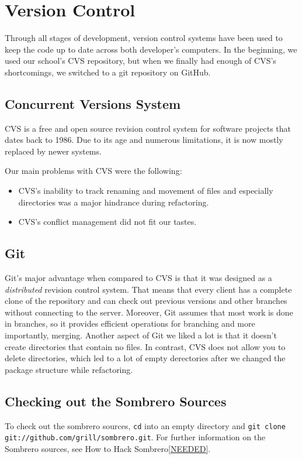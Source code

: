 \section{Version Control}

Through all stages of development, version control systems have been used to keep the code up to date across both developer's computers. In the beginning, we used our school's CVS repository, but when we finally had enough of CVS's shortcomings, we switched to a git repository on GitHub.


\subsection{Concurrent Versions System}

CVS is a free and open source revision control system for software projects that dates back to 1986. Due to its age and numerous limitations, it is now mostly replaced by newer systems.

Our main problems with CVS were the following:

\begin{itemize}
  \item CVS's inability to track renaming and movement of files and especially directories was a major hindrance during refactoring.
  \item CVS's conflict management did not fit our tastes.
\end{itemize}


\subsection{Git}

Git's major advantage when compared to CVS is that it was designed as a \emph{distributed} revision control system. That means that every client has a complete clone of the repository and can check out previous versions and other branches without connecting to the server. Moreover, Git assumes that most work is done in branches, so it provides efficient operations for branching and more importantly, merging. Another aspect of Git we liked a lot is that it doesn't create directories that contain no files. In contrast, CVS does not allow you to delete directories, which led to a lot of empty derectories after we changed the package structure while refactoring.

\subsection{Checking out the Sombrero Sources}

To check out the sombrero sources, \lstinline!cd! into an empty directory and \lstinline!git clone git://github.com/grill/sombrero.git!. For further information on the Sombrero sources, see How to Hack Sombrero\ref{NEEDED}.

